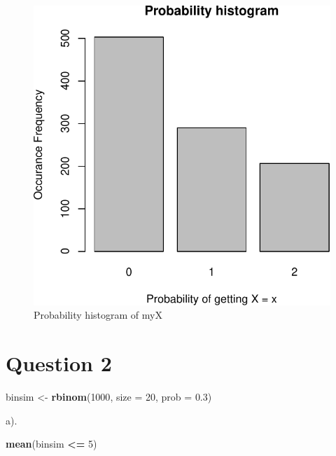 \documentclass[
]{article}
\newenvironment{Shaded}{\begin{snugshade}}{\end{snugshade}}
\newcommand{\AttributeTok}[1]{\textcolor[rgb]{0.13,0.29,0.53}{#1}}
\newcommand{\DecValTok}[1]{\textcolor[rgb]{0.00,0.00,0.81}{#1}}
\newcommand{\FloatTok}[1]{\textcolor[rgb]{0.00,0.00,0.81}{#1}}
\newcommand{\FunctionTok}[1]{\textcolor[rgb]{0.13,0.29,0.53}{\textbf{#1}}}
\newcommand{\NormalTok}[1]{#1}
\newcommand{\OtherTok}[1]{\textcolor[rgb]{0.56,0.35,0.01}{#1}}
\newcommand{\SpecialCharTok}[1]{\textcolor[rgb]{0.81,0.36,0.00}{\textbf{#1}}}
\begin{document}
\begin{figure}
\centering
\includegraphics{a2_files/figure-latex/unnamed-chunk-6-1.pdf}
\caption{Probability histogram of myX}
\end{figure}

\section{Question 2}\label{question-2}

\begin{Shaded}
\begin{Highlighting}[]
\NormalTok{binsim }\OtherTok{\textless{}{-}} \FunctionTok{rbinom}\NormalTok{(}\DecValTok{1000}\NormalTok{, }\AttributeTok{size =} \DecValTok{20}\NormalTok{, }\AttributeTok{prob =} \FloatTok{0.3}\NormalTok{)}
\end{Highlighting}
\end{Shaded}

a).

\begin{Shaded}
\begin{Highlighting}[]
\FunctionTok{mean}\NormalTok{(binsim }\SpecialCharTok{\textless{}=} \DecValTok{5}\NormalTok{)}
\end{Highlighting}
\end{Shaded}
\end{document}
